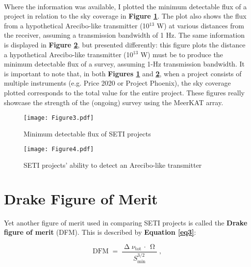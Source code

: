 \documentclass{article}
\begin{document}
\paragraph{}
Where the information was available, I plotted the minimum detectable flux of a project in relation to the sky coverage in \textbf{Figure \ref{fig4}}. The plot also shows the flux from a hypothetical Arecibo-like transmitter (10$^{13}$ W) at various distances from the receiver, assuming a transmission bandwidth of 1 Hz. The same information is displayed in \textbf{Figure \ref{fig5}}, but presented differently: this figure plots the distance a hypothetical Arecibo-like transmitter (10$^{13}$ W) must be to produce the minimum detectable flux of a survey, assuming 1-Hz transmission bandwidth. It is important to note that, in both \textbf{Figures \ref{fig4}} and \textbf{\ref{fig5}}, when a project consists of multiple instruments (e.g. Price 2020 or Project Phoenix), the sky coverage plotted corresponds to the total value for the entire project. These figures really showcase the strength of the (ongoing) survey using the MeerKAT array.

\begin{figure}[H]
\begin{center}
\texttt{[image: Figure3.pdf]}
\caption{Minimum detectable flux of SETI projects \textbf{\label{fig4}}}
\end{center}
\end{figure}

\begin{figure}[H]
\begin{center}
\texttt{[image: Figure4.pdf]}
\caption{SETI projects' ability to detect an Arecibo-like transmitter \textbf{\label{fig5}}}
\end{center}
\end{figure}


\section{Drake Figure of Merit}

\paragraph{}
Yet another figure of merit used in comparing SETI projects is called the \textbf{Drake figure of merit} (DFM). This is described by \textbf{Equation \ref{eq3}}:

\begin{equation}
\textrm{DFM} \; = \; \frac{\upDelta \nu_{\textrm{tot}} \, \cdot \, \upOmega}{S_{\textrm{min}}^{3/2}} \; ,
\label{eq3}
\end{equation}
\end{document}
